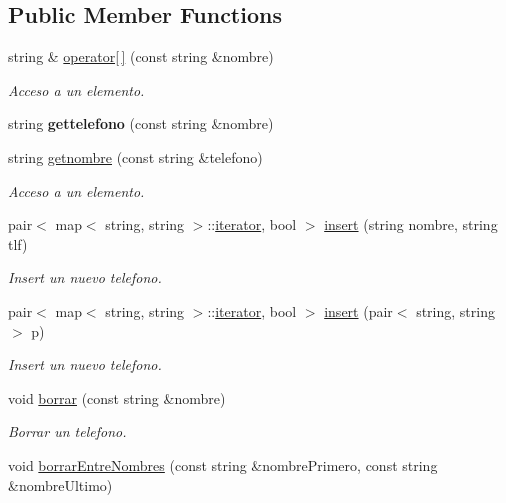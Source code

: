 \subsection*{Public Member Functions}
\begin{DoxyCompactItemize}
\item 
string \& \mbox{\hyperlink{classGuia__Tlf_ab2c734a7f3f3cd63ad95f525502474ea}{operator\mbox{[}$\,$\mbox{]}}} (const string \&nombre)
\begin{DoxyCompactList}\small\item\em Acceso a un elemento. \end{DoxyCompactList}\item 
\mbox{\label{classGuia__Tlf_a18593e3cf273db1a540cba69f87fd637}} 
string {\bfseries gettelefono} (const string \&nombre)
\item 
string \mbox{\hyperlink{classGuia__Tlf_ab3fc64c51278c56f2d610f2eab00bf49}{getnombre}} (const string \&telefono)
\begin{DoxyCompactList}\small\item\em Acceso a un elemento. \end{DoxyCompactList}\item 
pair$<$ map$<$ string, string $>$\+::\mbox{\hyperlink{classGuia__Tlf_1_1iterator}{iterator}}, bool $>$ \mbox{\hyperlink{classGuia__Tlf_add78a6fe5e8090ad6f71bbb160b70f77}{insert}} (string nombre, string tlf)
\begin{DoxyCompactList}\small\item\em Insert un nuevo telefono. \end{DoxyCompactList}\item 
pair$<$ map$<$ string, string $>$\+::\mbox{\hyperlink{classGuia__Tlf_1_1iterator}{iterator}}, bool $>$ \mbox{\hyperlink{classGuia__Tlf_a4c4e4cc9540896434edd915296e56c87}{insert}} (pair$<$ string, string $>$ p)
\begin{DoxyCompactList}\small\item\em Insert un nuevo telefono. \end{DoxyCompactList}\item 
void \mbox{\hyperlink{classGuia__Tlf_a57e32bbc9e76567d22e5275d4d2a6515}{borrar}} (const string \&nombre)
\begin{DoxyCompactList}\small\item\em Borrar un telefono. \end{DoxyCompactList}\item 
void \mbox{\hyperlink{classGuia__Tlf_ad7e5c338e32e8521b1211493e743399d}{borrar\+Entre\+Nombres}} (const string \&nombre\+Primero, const string \&nombre\+Ultimo)

\end{DoxyCompactItemize}
